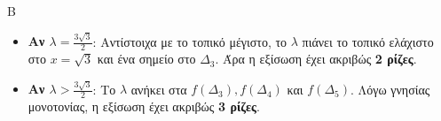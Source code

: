 \begin{thema}{Β}
\begin{erwthma}
\begin{itemize}
    \item \textbf{Αν $\lambda = \frac{3\sqrt{3}}{2}$}: 
    Αντίστοιχα με το τοπικό μέγιστο, το $\lambda$ πιάνει το τοπικό ελάχιστο στο $x = \sqrt{3}$ και ένα σημείο στο $\Delta_3$. Άρα η εξίσωση έχει ακριβώς \textbf{2 ρίζες}.
    
    \item \textbf{Αν $\lambda > \frac{3\sqrt{3}}{2}$}: 
    Το $\lambda$ ανήκει στα $f(\Delta_3), f(\Delta_4)$ και $f(\Delta_5)$. Λόγω γνησίας μονοτονίας, η εξίσωση έχει ακριβώς \textbf{3 ρίζες}.
\end{itemize}
\end{erwthma}
\end{thema}
